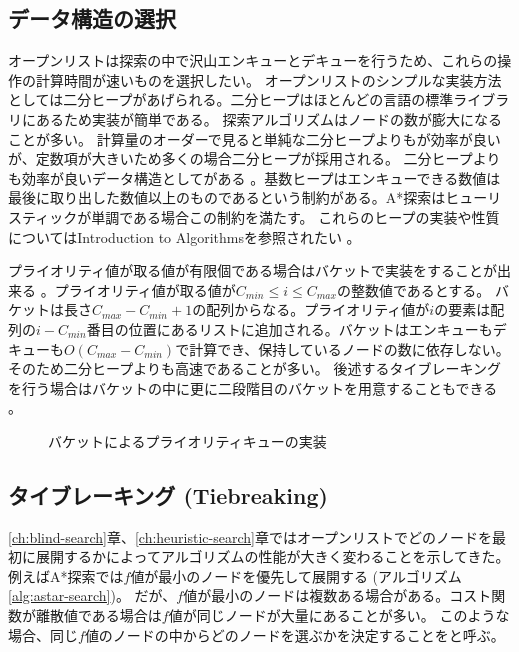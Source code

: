 \subsection{データ構造の選択}
\label{sec:priority-queue}

オープンリストは探索の中で沢山エンキューとデキューを行うため、これらの操作の計算時間が速いものを選択したい。
オープンリストのシンプルな実装方法としては二分ヒープがあげられる。二分ヒープはほとんどの言語の標準ライブラリにあるため実装が簡単である。
探索アルゴリズムはノードの数が膨大になることが多い。
計算量のオーダーで見ると単純な二分ヒープよりもが効率が良いが、定数項が大きいため多くの場合二分ヒープが採用される。
二分ヒープよりも効率が良いデータ構造としてがある \cite{ahuja1990faster}。基数ヒープはエンキューできる数値は最後に取り出した数値以上のものであるという制約がある。A*探索はヒューリスティックが単調である場合この制約を満たす。
これらのヒープの実装や性質についてはIntroduction to Algorithmsを参照されたい \cite{cormen01}。

プライオリティ値が取る値が有限個である場合はバケットで実装をすることが出来る \cite{burns2012implementing}。プライオリティ値が取る値が$C_{min} \leq i \leq C_{max}$の整数値であるとする。
バケットは長さ$C_{max} - C_{min} + 1$の配列からなる。プライオリティ値が$i$の要素は配列の$i - C_{min}$番目の位置にあるリストに追加される。バケットはエンキューもデキューも$O(C_{max} - C_{min})$で計算でき、保持しているノードの数に依存しない。そのため二分ヒープよりも高速であることが多い。
後述するタイブレーキングを行う場合はバケットの中に更に二段階目のバケットを用意することもできる \cite{burns2012implementing}。

\begin{figure}
\caption{バケットによるプライオリティキューの実装}
\end{figure}


\subsection{タイブレーキング (Tiebreaking)}
\label{sec:tiebreaking}

\ref{ch:blind-search}章、\ref{ch:heuristic-search}章ではオープンリストでどのノードを最初に展開するかによってアルゴリズムの性能が大きく変わることを示してきた。
例えばA*探索では$f$値が最小のノードを優先して展開する (アルゴリズム\ref{alg:astar-search})。
だが、$f$値が最小のノードは複数ある場合がある。コスト関数が離散値である場合は$f$値が同じノードが大量にあることが多い。
このような場合、同じ$f$値のノードの中からどのノードを選ぶかを決定することをと呼ぶ。

